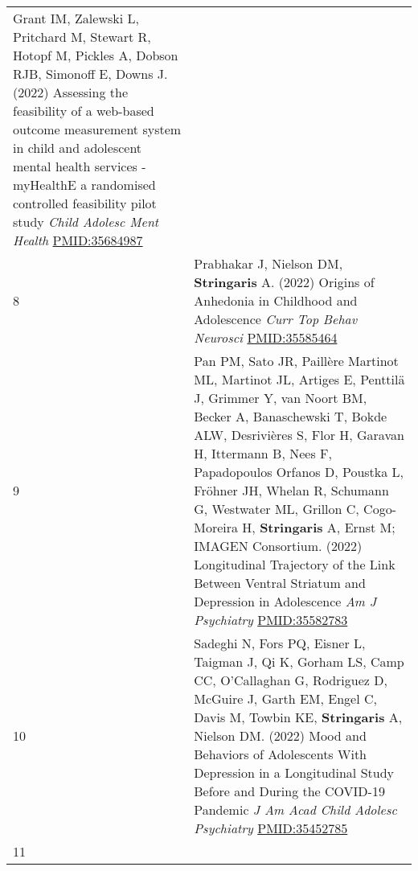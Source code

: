 \documentclass[
]{article}
\begin{document}
\begin{longtable}[]{@{}ll@{}}
\begin{minipage}[t]{0.94\columnwidth}
Grant IM, Zalewski L, Pritchard M, Stewart R, Hotopf M, Pickles A,
Dobson RJB, Simonoff E, Downs J. (2022) Assessing the feasibility of a
web-based outcome measurement system in child and adolescent mental
health services - myHealthE a randomised controlled feasibility pilot
study \emph{Child Adolesc Ment Health} \url{PMID:35684987}\strut
\end{minipage}\tabularnewline
\begin{minipage}[t]{0.01\columnwidth}\raggedright
8\strut
\end{minipage} & \begin{minipage}[t]{0.94\columnwidth}\raggedright
Prabhakar J, Nielson DM, \textbf{Stringaris} A. (2022) Origins of
Anhedonia in Childhood and Adolescence \emph{Curr Top Behav Neurosci}
\url{PMID:35585464}\strut
\end{minipage}\tabularnewline
\begin{minipage}[t]{0.01\columnwidth}\raggedright
9\strut
\end{minipage} & \begin{minipage}[t]{0.94\columnwidth}\raggedright
Pan PM, Sato JR, Paillère Martinot ML, Martinot JL, Artiges E, Penttilä
J, Grimmer Y, van Noort BM, Becker A, Banaschewski T, Bokde ALW,
Desrivières S, Flor H, Garavan H, Ittermann B, Nees F, Papadopoulos
Orfanos D, Poustka L, Fröhner JH, Whelan R, Schumann G, Westwater ML,
Grillon C, Cogo-Moreira H, \textbf{Stringaris} A, Ernst M; IMAGEN
Consortium. (2022) Longitudinal Trajectory of the Link Between Ventral
Striatum and Depression in Adolescence \emph{Am J Psychiatry}
\url{PMID:35582783}\strut
\end{minipage}\tabularnewline
\begin{minipage}[t]{0.01\columnwidth}\raggedright
10\strut
\end{minipage} & \begin{minipage}[t]{0.94\columnwidth}\raggedright
Sadeghi N, Fors PQ, Eisner L, Taigman J, Qi K, Gorham LS, Camp CC,
O'Callaghan G, Rodriguez D, McGuire J, Garth EM, Engel C, Davis M,
Towbin KE, \textbf{Stringaris} A, Nielson DM. (2022) Mood and Behaviors
of Adolescents With Depression in a Longitudinal Study Before and During
the COVID-19 Pandemic \emph{J Am Acad Child Adolesc Psychiatry}
\url{PMID:35452785}\strut
\end{minipage}\tabularnewline
\begin{minipage}[t]{0.01\columnwidth}\raggedright
11\strut
\end{minipage} & \begin{minipage}[t]{0.94\columnwidth}\raggedright

\end{minipage}
\end{longtable}
\end{document}

